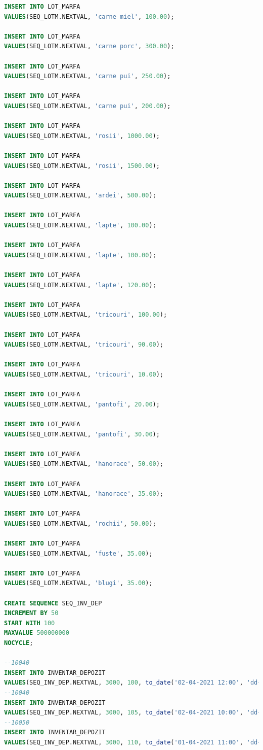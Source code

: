 \documentclass[12pt, a4paper]{article}
\begin{document}
\begin{lstlisting}[language=SQL]
INSERT INTO LOT_MARFA
VALUES(SEQ_LOTM.NEXTVAL, 'carne miel', 100.00);

INSERT INTO LOT_MARFA
VALUES(SEQ_LOTM.NEXTVAL, 'carne porc', 300.00);

INSERT INTO LOT_MARFA
VALUES(SEQ_LOTM.NEXTVAL, 'carne pui', 250.00);

INSERT INTO LOT_MARFA
VALUES(SEQ_LOTM.NEXTVAL, 'carne pui', 200.00);

INSERT INTO LOT_MARFA
VALUES(SEQ_LOTM.NEXTVAL, 'rosii', 1000.00);

INSERT INTO LOT_MARFA
VALUES(SEQ_LOTM.NEXTVAL, 'rosii', 1500.00);

INSERT INTO LOT_MARFA
VALUES(SEQ_LOTM.NEXTVAL, 'ardei', 500.00);

INSERT INTO LOT_MARFA
VALUES(SEQ_LOTM.NEXTVAL, 'lapte', 100.00);

INSERT INTO LOT_MARFA
VALUES(SEQ_LOTM.NEXTVAL, 'lapte', 100.00);

INSERT INTO LOT_MARFA
VALUES(SEQ_LOTM.NEXTVAL, 'lapte', 120.00);

INSERT INTO LOT_MARFA
VALUES(SEQ_LOTM.NEXTVAL, 'tricouri', 100.00);

INSERT INTO LOT_MARFA
VALUES(SEQ_LOTM.NEXTVAL, 'tricouri', 90.00);

INSERT INTO LOT_MARFA
VALUES(SEQ_LOTM.NEXTVAL, 'tricouri', 10.00);

INSERT INTO LOT_MARFA
VALUES(SEQ_LOTM.NEXTVAL, 'pantofi', 20.00);

INSERT INTO LOT_MARFA
VALUES(SEQ_LOTM.NEXTVAL, 'pantofi', 30.00);

INSERT INTO LOT_MARFA
VALUES(SEQ_LOTM.NEXTVAL, 'hanorace', 50.00);

INSERT INTO LOT_MARFA
VALUES(SEQ_LOTM.NEXTVAL, 'hanorace', 35.00);

INSERT INTO LOT_MARFA
VALUES(SEQ_LOTM.NEXTVAL, 'rochii', 50.00);

INSERT INTO LOT_MARFA
VALUES(SEQ_LOTM.NEXTVAL, 'fuste', 35.00);

INSERT INTO LOT_MARFA
VALUES(SEQ_LOTM.NEXTVAL, 'blugi', 35.00);

CREATE SEQUENCE SEQ_INV_DEP
INCREMENT BY 50
START WITH 100
MAXVALUE 500000000
NOCYCLE;

--10040
INSERT INTO INVENTAR_DEPOZIT
VALUES(SEQ_INV_DEP.NEXTVAL, 3000, 100, to_date('02-04-2021 12:00', 'dd-mm-yyyy hh24:mi'), null);
--10040
INSERT INTO INVENTAR_DEPOZIT
VALUES(SEQ_INV_DEP.NEXTVAL, 3000, 105, to_date('02-04-2021 10:00', 'dd-mm-yyyy hh24:mi'), null);
--10050
INSERT INTO INVENTAR_DEPOZIT
VALUES(SEQ_INV_DEP.NEXTVAL, 3000, 110, to_date('01-04-2021 11:00', 'dd-mm-yyyy hh24:mi'), null);


\end{lstlisting}
\end{document}
